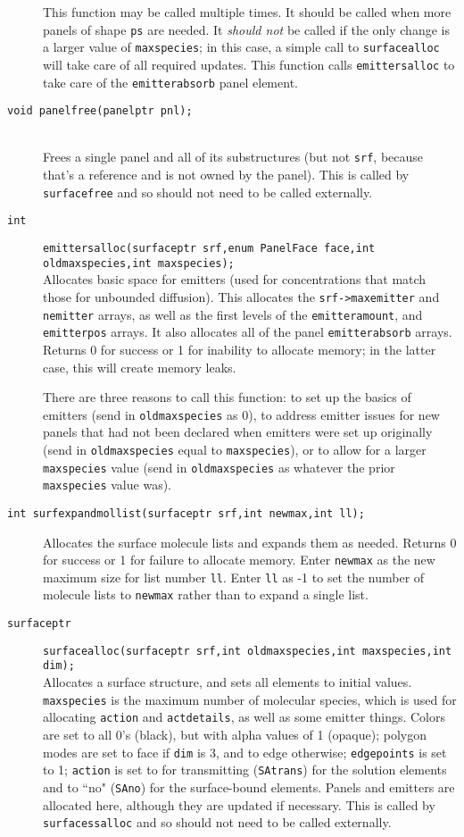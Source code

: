\documentclass {scrbook}
\newcommand {\ttt} {\texttt}
\begin{document}
\begin{description}
This function may be called multiple times. It should be called when more panels of shape \ttt{ps} are needed. It \emph{should not} be called if the only change is a larger value of \ttt{maxspecies}; in this case, a simple call to \ttt{surfacealloc} will take care of all required updates. This function calls \ttt{emittersalloc} to take care of the \ttt{emitterabsorb} panel element.

\item[\ttt{void panelfree(panelptr pnl);}]
\hfill \\
Frees a single panel and all of its substructures (but not \ttt{srf}, because that's a reference and is not owned by the panel). This is called by \ttt{surfacefree} and so should not need to be called externally.

\item[\ttt{int}]
\ttt{emittersalloc(surfaceptr srf,enum PanelFace face,int oldmaxspecies,int maxspecies);}
\hfill \\
Allocates basic space for emitters (used for concentrations that match those for unbounded diffusion). This allocates the \ttt{srf->maxemitter} and \ttt{nemitter} arrays, as well as the first levels of the \ttt{emitteramount}, and \ttt{emitterpos} arrays. It also allocates all of the panel \ttt{emitterabsorb} arrays. Returns 0 for success or 1 for inability to allocate memory; in the latter case, this will create memory leaks.

There are three reasons to call this function: to set up the basics of emitters (send in \ttt{oldmaxspecies} as 0), to address emitter issues for new panels that had not been declared when emitters were set up originally (send in \ttt{oldmaxspecies} equal to \ttt{maxspecies}), or to allow for a larger \ttt{maxspecies} value (send in \ttt{oldmaxspecies} as whatever the prior \ttt{maxspecies} value was).

\item[\ttt{int surfexpandmollist(surfaceptr srf,int newmax,int ll);}]
\hfill
Allocates the surface molecule lists and expands them as needed. Returns 0 for success or 1 for failure to allocate memory. Enter \ttt{newmax} as the new maximum size for list number \ttt{ll}. Enter \ttt{ll} as -1 to set the number of molecule lists to \ttt{newmax} rather than to expand a single list.

\item[\ttt{surfaceptr}]
\ttt{surfacealloc(surfaceptr srf,int oldmaxspecies,int maxspecies,int dim);}
\hfill \\
Allocates a surface structure, and sets all elements to initial values. \ttt{maxspecies} is the maximum number of molecular species, which is used for allocating \ttt{action} and \ttt{actdetails}, as well as some emitter things. Colors are set to all 0's (black), but with alpha values of 1 (opaque); polygon modes are set to face if \ttt{dim} is 3, and to edge otherwise; \ttt{edgepoints} is set to 1; \ttt{action} is set to for transmitting (\ttt{SAtrans}) for the solution elements and to ``no" (\ttt{SAno}) for the surface-bound elements. Panels and emitters are allocated here, although they are updated if necessary. This is called by \ttt{surfacessalloc} and so should not need to be called externally.


\end{description}
\end{document}
